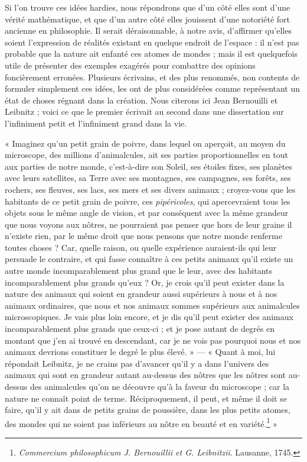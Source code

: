 \documentclass[a4paper, 11pt, oneside]{article}
\begin{document}
Si l'on trouve ces idées hardies, nous répondrons que d'un côté elles sont d'une vérité mathématique, et que d'un autre côté elles jouissent d'une notoriété fort ancienne en philosophie. Il serait déraisonnable, à notre avis, d'affirmer qu'elles soient l'expression de réalités existant en quelque endroit de l'espace : il n'est pas probable que la nature ait enfanté ces atomes de mondes ; mais il est quelquefois utile de présenter des exemples exagérés pour combattre des opinions foncièrement erronées. Plusieurs écrivains, et des plus renommés, non contents de formuler simplement ces idées, les ont de plus considérées comme représentant un état de choses régnant dans la création. Nous citerons ici Jean Bernouilli et Leibnitz ; voici ce que le premier écrivait au second dans une dissertation sur l'infiniment petit et l'infiniment grand dans la vie.

« Imaginez qu'un petit grain de poivre, dans lequel on aperçoit, au moyen du microscope, des millions d'animalcules, ait ses parties proportionnelles en tout aux parties de notre monde, c'est-à-dire son Soleil, ses étoiles fixes, ses planètes avec leurs satellites, sa Terre avec ses montagnes, ses campagnes, ses forêts, ses rochers, ses fleuves, ses lacs, ses mers et ses divers animaux ; croyez-vous que les habitants de ce petit grain de poivre, ces \emph{pipéricoles}, qui apercevraient tous les objets sous le même angle de vision, et par conséquent avec la même grandeur que nous voyons aux nôtres, ne pourraient pas penser que hors de leur graine il n'existe rien, par le même droit que nous pensons que notre monde renferme toutes choses ? Car, quelle raison, ou quelle expérience auraient-ils qui leur persuade le contraire, et qui fasse connaître à ces petits animaux qu'il existe un autre monde incomparablement plus grand que le leur, avec des habitants incomparablement plus grands qu'eux ? Or, je crois qu'il peut exister dans la nature des animaux qui soient en grandeur aussi supérieurs à nous et à nos animaux ordinaires, que nous et nos animaux sommes supérieurs aux animalcules microscopiques. Je vais plus loin encore, et je dis qu'il peut exister des animaux incomparablement plus grands que ceux-ci ; et je pose autant de degrés en montant que j'en ai trouvé en descendant, car je ne vois pas pourquoi nous et nos animaux devrions constituer le degré le plus élevé. » --- « Quant à moi, lui répondait Leibnitz, je ne crains pas d'avancer qu'il y a dans l'univers des animaux qui sont en grandeur autant au-dessus des nôtres que les nôtres sont au-dessus des animalcules qu'on ne découvre qu'à la faveur du microscope ; car la nature ne connaît point de terme. Réciproquement, il peut, et même il doit se faire, qu'il y ait dans de petits grains de poussière, dans les plus petits atomes, des mondes qui ne soient pas inférieurs au nôtre en beauté et en variété.\footnote{\emph{Commercium philosophicum J. Bernouillii et G. Leibnitzii}. Lausanne, 1745.} »
\end{document}

